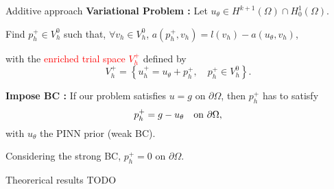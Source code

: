 \begin{frame}{Additive approach}
	\textbf{Variational Problem :} Let $u_{\theta} \in H^{k+1}(\Omega)\cap H^1_0(\Omega)$.
	\begin{center}
		Find $p_h^+ \in V_h^0$ such that, $\forall v_h \in V_h^0$, $a(p_h^+,v_h) = l(v_h) - a(u_{\theta},v_h)$,
	\end{center}
	\begin{minipage}[t]{0.6\linewidth}
		with the \textcolor{red}{enriched trial space $V_h^+$} defined by
		\begin{equation*}
			V_h^+ = \left\{
			u_h^+= u_{\theta} + p_h^+, \quad p_h^+ \in V_h^0
			\right\}.
		\end{equation*}
	
		\vspace{10pt}
	
		\textbf{Impose BC :} If our problem satisfies $u=g$ on $\partial \Omega$,
		then $p_h^+$ has to satisfy
		\[
			p_h^+ = g - u_{\theta} \text{\quad on } \partial \Omega,
		\]
		with $u_\theta$ the PINN prior (weak BC). 
	
		\vspace{10pt}
	
		Considering the strong BC, $p_h^+=0$ on $\partial \Omega$.
	\end{minipage} \qquad \begin{minipage}[t][][b]{0.28\linewidth}
		\vspace{-8pt}
		\centering
	\end{minipage}
\end{frame}

\begin{frame}{Theorerical results}
	TODO
\end{frame}
